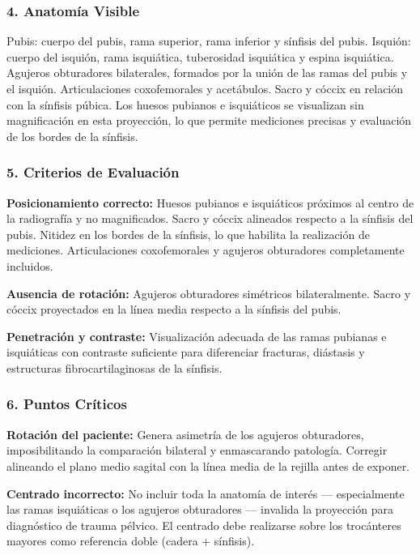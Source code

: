 		\subsubsection*{4. Anatomía Visible}
		
		Pubis: cuerpo del pubis, rama superior, rama inferior y sínfisis del pubis. Isquión: cuerpo del isquión, rama isquiática, tuberosidad isquiática y espina isquiática. Agujeros obturadores bilaterales, formados por la unión de las ramas del pubis y el isquión. Articulaciones coxofemorales y acetábulos. Sacro y cóccix en relación con la sínfisis púbica. Los huesos pubianos e isquiáticos se visualizan sin magnificación en esta proyección, lo que permite mediciones precisas y evaluación de los bordes de la sínfisis.
		
		\subsubsection*{5. Criterios de Evaluación}
		
		\textbf{Posicionamiento correcto:} Huesos pubianos e isquiáticos próximos al centro de la radiografía y no magnificados. Sacro y cóccix alineados respecto a la sínfisis del pubis. Nitidez en los bordes de la sínfisis, lo que habilita la realización de mediciones. Articulaciones coxofemorales y agujeros obturadores completamente incluidos.
		
		\textbf{Ausencia de rotación:} Agujeros obturadores simétricos bilateralmente. Sacro y cóccix proyectados en la línea media respecto a la sínfisis del pubis.
		
		\textbf{Penetración y contraste:} Visualización adecuada de las ramas pubianas e isquiáticas con contraste suficiente para diferenciar fracturas, diástasis y estructuras fibrocartilaginosas de la sínfisis.
		
		\subsubsection*{6. Puntos Críticos}
		
		\textbf{Rotación del paciente:} Genera asimetría de los agujeros obturadores, imposibilitando la comparación bilateral y enmascarando patología. Corregir alineando el plano medio sagital con la línea media de la rejilla antes de exponer.
		
		\textbf{Centrado incorrecto:} No incluir toda la anatomía de interés --- especialmente las ramas isquiáticas o los agujeros obturadores --- invalida la proyección para diagnóstico de trauma pélvico. El centrado debe realizarse sobre los trocánteres mayores como referencia doble (cadera + sínfisis).
		
